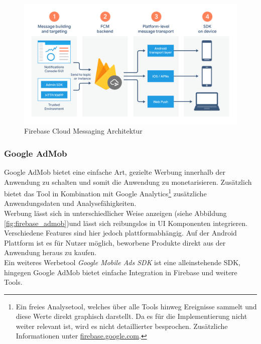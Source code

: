 \begin{figure}[htb]
	\begin{center}
		\includegraphics[scale=0.23]{images/firebase_cloudmessaging_architecture.png}
	\end{center}
	\caption{Firebase Cloud Messaging Architektur}
	\label{fig:cloudmessaging_architecture}
\end{figure}

\subsubsection{Google AdMob}
Google AdMob bietet eine einfache Art, gezielte Werbung innerhalb der Anwendung zu schalten und somit die Anwendung zu monetarisieren.
Zusätzlich bietet das Tool in Kombination mit Google Analytics\footnote{Ein freies Analysetool, welches über alle Tools hinweg Ereignisse sammelt und diese Werte direkt graphisch darstellt. Da es für die Implementierung nicht weiter relevant ist, wird es nicht detaillierter besprochen. Zusätzliche Informationen unter \href{https://firebase.google.com/docs/analytics}{firebase.google.com}.} zusätzliche Anwendungsdaten und Analysefähigkeiten.\\
Werbung lässt sich in unterschiedlicher Weise anzeigen (siehe Abbildung \ref{fig:firebase_admob})und lässt sich reibungslos in UI Komponenten integrieren. 
Verschiedene Features sind hier jedoch plattformabhängig. 
Auf der Android Plattform ist es für Nutzer möglich, beworbene Produkte direkt aus der Anwendung heraus zu kaufen.\\
Ein weiteres Werbetool \textit{Google Mobile Ads SDK} ist eine alleinstehende SDK, hingegen Google AdMob bietet einfache Integration in Firebase und weitere Tools.\cite{firebase2021}

